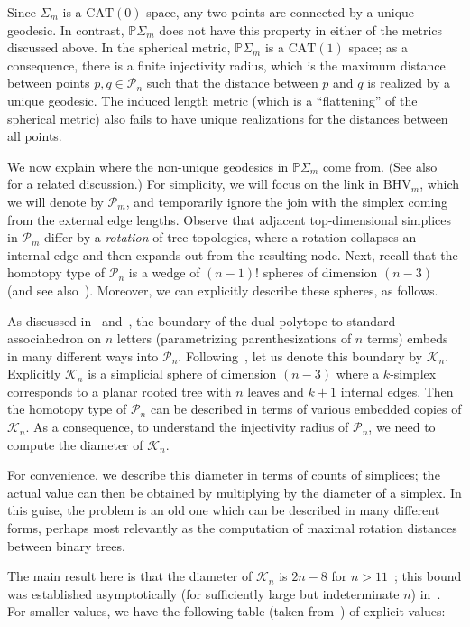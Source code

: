 \documentclass[a4paper,11pt]{article}
\newcommand{\CAT}{\textrm{CAT}}
\newcommand{\BHV}{\textrm{BHV}}
\newcommand{\aK}{\mathcal{K}}
\newcommand{\aP}{\mathcal{P}}
\begin{document}
Since $\Sigma_m$ is a $\CAT(0)$ space, any two points are connected by a unique geodesic.
In contrast, $\mathbb{P}\Sigma_m$ does not have this property in either of the metrics discussed above.
In the spherical metric, $\mathbb{P}\Sigma_m$ is a $\CAT(1)$ space; as a consequence, there is a finite injectivity radius, which is the maximum distance between points $p,q \in \aP_n$ such that the distance between $p$ and $q$ is realized by a unique geodesic.
The induced length metric (which is a ``flattening'' of the spherical metric) also fails to have unique realizations for the distances between all points.

We now explain where the non-unique geodesics in $\mathbb{P}\Sigma_m$
come from.  (See also~\cite[3.3]{billera2001geometry} for a related discussion.)
For simplicity, we will focus on the link in $\BHV_m$, which we will denote by $\aP_m$, and temporarily ignore the join with the simplex coming from the external edge lengths.
Observe that adjacent top-dimensional simplices in $\aP_m$ differ by a {\em rotation} of tree topologies, where a rotation collapses an internal edge and then expands out from the resulting node.
Next, recall that the homotopy type of $\aP_n$ is a wedge of $(n-1)!$ spheres of dimension $(n-3)$~\cite{robinson1996tree} (and see also~\cite[Thm. 6]{devadoss2014polyhedral}).
Moreover, we can explicitly describe these spheres, as follows.

As discussed in~\cite[Prop. 1]{devadoss2014polyhedral} and~\cite[\S 3.1]{billera2001geometry}, the boundary of the dual polytope to standard associahedron on $n$ letters (parametrizing parenthesizations of $n$ terms) embeds in many different ways into $\aP_n$.
Following~\cite{devadoss2014polyhedral}, let us denote this boundary by $\aK_n$.
Explicitly $\aK_n$ is a simplicial sphere of dimension $(n-3)$ where a $k$-simplex corresponds to a planar rooted tree with $n$ leaves and $k+1$ internal edges.
Then the homotopy type of $\aP_n$ can be described in terms of various embedded copies of $\aK_n$.
As a consequence, to understand the injectivity radius of $\aP_n$, we need to compute the diameter of $\aK_n$.

For convenience, we describe this diameter in terms of counts of simplices; the actual value can then be obtained by multiplying by the diameter of a simplex.
In this guise, the problem is an old one which can be described in many different forms, perhaps most relevantly as the computation of maximal rotation distances between binary trees.

The main result here is that the diameter of $\aK_n$ is $2n - 8$ for $n > 11$~\cite{pournin2014diameter}; this bound was established asymptotically (for sufficiently large but indeterminate $n$) in~\cite{sleator1988rotation}.
For smaller values, we have the following table (taken from~\cite[\S2.3]{sleator1988rotation}) of explicit values:
\end{document}
